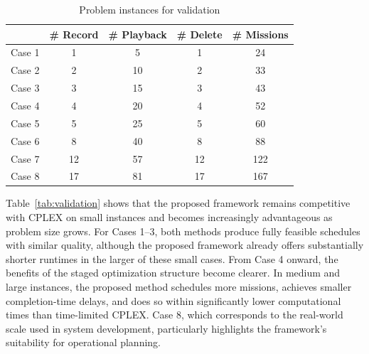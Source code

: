 \documentclass[preprint,3p,12pt,authoryear]{elsarticle}
\begin{document}
\begin{table}[h!]
\caption{Problem instances for validation}
\label{tab:instances}
\centering
\begin{tabular}{lcccc}
\toprule
 & \# Record & \# Playback & \# Delete & \# Missions \\
\midrule
Case 1 & 1 & 5 & 1 & 24 \\
Case 2 & 2 & 10 & 2 & 33 \\
Case 3 & 3 & 15 & 3 & 43 \\
Case 4 & 4 & 20 & 4 & 52 \\
Case 5 & 5 & 25 & 5 & 60 \\
Case 6 & 8 & 40 & 8 & 88 \\
Case 7 & 12 & 57 & 12 & 122 \\
Case 8 & 17 & 81 & 17 & 167 \\
\bottomrule
\end{tabular}
\end{table}

\noindent Table~\ref{tab:validation} shows that the proposed framework remains competitive with CPLEX on small instances and becomes increasingly advantageous as problem size grows. For Cases 1--3, both methods produce fully feasible schedules with similar quality, although the proposed framework already offers substantially shorter runtimes in the larger of these small cases. From Case 4 onward, the benefits of the staged optimization structure become clearer. In medium and large instances, the proposed method schedules more missions, achieves smaller completion-time delays, and does so within significantly lower computational times than time-limited CPLEX. Case 8, which corresponds to the real-world scale used in system development, particularly highlights the framework's suitability for operational planning.
\end{document}
